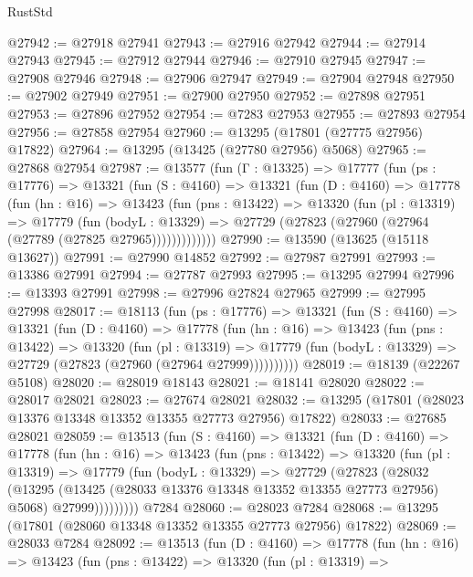 \begin{lexlean}{RustStd}
\begin{coremodule}
@27942 := @27918 @27941
@27943 := @27916 @27942
@27944 := @27914 @27943
@27945 := @27912 @27944
@27946 := @27910 @27945
@27947 := @27908 @27946
@27948 := @27906 @27947
@27949 := @27904 @27948
@27950 := @27902 @27949
@27951 := @27900 @27950
@27952 := @27898 @27951
@27953 := @27896 @27952
@27954 := @7283 @27953
@27955 := @27893 @27954
@27956 := @27858 @27954
@27960 := @13295 (@17801 (@27775 @27956) @17822)
@27964 := @13295 (@13425 (@27780 @27956) @5068)
@27965 := @27868 @27954
@27987 := @13577
    (fun (Γ : @13325) =>
    @17777
      (fun (ps : @17776) =>
      @13321
        (fun (S : @4160) =>
        @13321
          (fun (D : @4160) =>
          @17778
            (fun (hn : @16) =>
            @13423
              (fun (pns : @13422) =>
              @13320
                (fun (pl : @13319) =>
                @17779
                  (fun (bodyL : @13329) =>
                  @27729 (@27823 (@27960 (@27964 (@27789 (@27825 @27965)))))))))))))
@27990 := @13590 (@13625 (@15118 @13627))
@27991 := @27990 @14852
@27992 := @27987 @27991
@27993 := @13386 @27991
@27994 := @27787 @27993
@27995 := @13295 @27994
@27996 := @13393 @27991
@27998 := @27996 @27824 @27965
@27999 := @27995 @27998
@28017 := @18113
    (fun (ps : @17776) =>
    @13321
      (fun (S : @4160) =>
      @13321
        (fun (D : @4160) =>
        @17778
          (fun (hn : @16) =>
          @13423
            (fun (pns : @13422) =>
            @13320
              (fun (pl : @13319) =>
              @17779 (fun (bodyL : @13329) => @27729 (@27823 (@27960 (@27964 @27999))))))))))
@28019 := @18139 (@22267 @5108)
@28020 := @28019 @18143
@28021 := @18141 @28020
@28022 := @28017 @28021
@28023 := @27674 @28021
@28032 := @13295 (@17801 (@28023 @13376 @13348 @13352 @13355 @27773 @27956) @17822)
@28033 := @27685 @28021
@28059 := @13513
    (fun (S : @4160) =>
    @13321
      (fun (D : @4160) =>
      @17778
        (fun (hn : @16) =>
        @13423
          (fun (pns : @13422) =>
          @13320
            (fun (pl : @13319) =>
            @17779
              (fun (bodyL : @13329) =>
              @27729
                (@27823
                  (@28032
                    (@13295
                      (@13425 (@28033 @13376 @13348 @13352 @13355 @27773 @27956) @5068)
                      @27999)))))))))
    @7284
@28060 := @28023 @7284
@28068 := @13295 (@17801 (@28060 @13348 @13352 @13355 @27773 @27956) @17822)
@28069 := @28033 @7284
@28092 := @13513
    (fun (D : @4160) =>
    @17778
      (fun (hn : @16) =>
      @13423
        (fun (pns : @13422) =>
        @13320
          (fun (pl : @13319) =>

\end{coremodule}
\end{lexlean}

